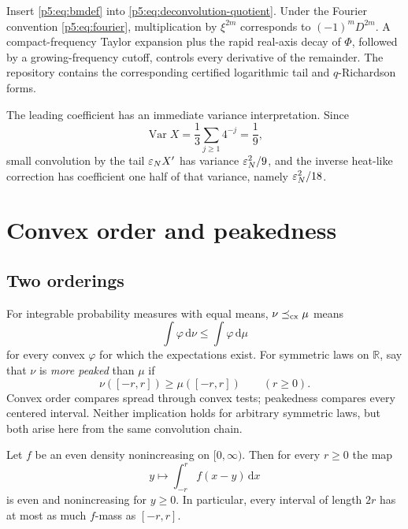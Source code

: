 \documentclass[11pt,oneside]{article}
\numberwithin{equation}{section}
\theoremstyle{definition}
\theoremstyle{remark}
\newcommand{\R}{\mathbb R}
\newcommand{\Var}{\operatorname{Var}}
\newcommand{\dd}{\,\mathrm d}
\begin{document}
\begin{proofidea}
Insert \eqref{p5:eq:bmdef} into \eqref{p5:eq:deconvolution-quotient}.  Under the Fourier convention \eqref{p5:eq:fourier}, multiplication by $\xi^{2m}$ corresponds to $(-1)^mD^{2m}$.  A compact-frequency Taylor expansion plus the rapid real-axis decay of $\Phi$, followed by a growing-frequency cutoff, controls every derivative of the remainder.  The repository contains the corresponding certified logarithmic tail and $q$-Richardson forms.
\end{proofidea}

The leading coefficient has an immediate variance interpretation.  Since
\begin{equation}
 \Var X=\frac13\sum_{j\ge1}4^{-j}=\frac19,
 \label{p5:eq:varX}
\end{equation}
small convolution by the tail $\varepsilon_NX'$ has variance $\varepsilon_N^2/9$, and the inverse heat-like correction has coefficient one half of that variance, namely $\varepsilon_N^2/18$.

\section{Convex order and peakedness}
\label{p5:sec:order}

\subsection{Two orderings}

For integrable probability measures with equal means, $\nu\preceq_{\rm cx}\mu$ means
\[
 \int\varphi\dd\nu\le\int\varphi\dd\mu
\]
for every convex $\varphi$ for which the expectations exist.  For symmetric laws on $\R$, say that $\nu$ is \emph{more peaked} than $\mu$ if
\begin{equation}
 \nu([-r,r])\ge\mu([-r,r])\qquad(r\ge0).
 \label{p5:eq:peaked}
\end{equation}
Convex order compares spread through convex tests; peakedness compares every centered interval.  Neither implication holds for arbitrary symmetric laws, but both arise here from the same convolution chain.

\begin{lemma}
Let $f$ be an even density nonincreasing on $[0,\infty)$.  Then for every $r\ge0$ the map
\[
 y\longmapsto\int_{-r}^{r}f(x-y)\dd x
\]
is even and nonincreasing for $y\ge0$.  In particular, every interval of length $2r$ has at most as much $f$-mass as $[-r,r]$.
\end{lemma}
\end{document}
